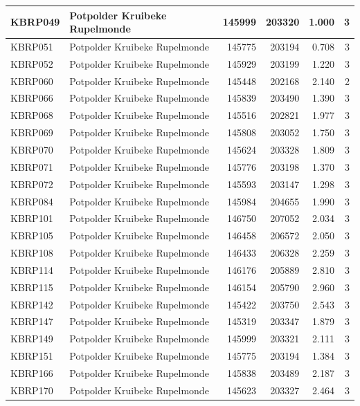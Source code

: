 \documentclass[11pt,]{book}
\begin{document}
\begin{table}
\begin{tabular}[t]{l|l|r|r|r|r}
\hline
KBRP049 & Potpolder Kruibeke Rupelmonde & 145999 & 203320 & 1.000 & 3\\
\hline
KBRP051 & Potpolder Kruibeke Rupelmonde & 145775 & 203194 & 0.708 & 3\\
\hline
KBRP052 & Potpolder Kruibeke Rupelmonde & 145929 & 203199 & 1.220 & 3\\
\hline
KBRP060 & Potpolder Kruibeke Rupelmonde & 145448 & 202168 & 2.140 & 2\\
\hline
KBRP066 & Potpolder Kruibeke Rupelmonde & 145839 & 203490 & 1.390 & 3\\
\hline
KBRP068 & Potpolder Kruibeke Rupelmonde & 145516 & 202821 & 1.977 & 3\\
\hline
KBRP069 & Potpolder Kruibeke Rupelmonde & 145808 & 203052 & 1.750 & 3\\
\hline
KBRP070 & Potpolder Kruibeke Rupelmonde & 145624 & 203328 & 1.809 & 3\\
\hline
KBRP071 & Potpolder Kruibeke Rupelmonde & 145776 & 203198 & 1.370 & 3\\
\hline
KBRP072 & Potpolder Kruibeke Rupelmonde & 145593 & 203147 & 1.298 & 3\\
\hline
KBRP084 & Potpolder Kruibeke Rupelmonde & 145984 & 204655 & 1.990 & 3\\
\hline
KBRP101 & Potpolder Kruibeke Rupelmonde & 146750 & 207052 & 2.034 & 3\\
\hline
KBRP105 & Potpolder Kruibeke Rupelmonde & 146458 & 206572 & 2.050 & 3\\
\hline
KBRP108 & Potpolder Kruibeke Rupelmonde & 146433 & 206328 & 2.259 & 3\\
\hline
KBRP114 & Potpolder Kruibeke Rupelmonde & 146176 & 205889 & 2.810 & 3\\
\hline
KBRP115 & Potpolder Kruibeke Rupelmonde & 146154 & 205790 & 2.960 & 3\\
\hline
KBRP142 & Potpolder Kruibeke Rupelmonde & 145422 & 203750 & 2.543 & 3\\
\hline
KBRP147 & Potpolder Kruibeke Rupelmonde & 145319 & 203347 & 1.879 & 3\\
\hline
KBRP149 & Potpolder Kruibeke Rupelmonde & 145999 & 203321 & 2.111 & 3\\
\hline
KBRP151 & Potpolder Kruibeke Rupelmonde & 145775 & 203194 & 1.384 & 3\\
\hline
KBRP166 & Potpolder Kruibeke Rupelmonde & 145838 & 203489 & 2.187 & 3\\
\hline
KBRP170 & Potpolder Kruibeke Rupelmonde & 145623 & 203327 & 2.464 & 3\\

\end{tabular}
\end{table}
\end{document}
